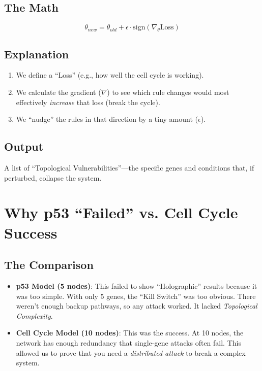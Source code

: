 \documentclass[11pt,a4paper]{article}
\begin{document}
\subsection*{The Math}
\begin{equation}
\theta_{new} = \theta_{old} + \epsilon \cdot \text{sign}(\nabla_{\theta} \text{Loss})
\end{equation}

\subsection*{Explanation}
\begin{enumerate}
    \item We define a ``Loss'' (e.g., how well the cell cycle is working).
    \item We calculate the gradient ($\nabla$) to see which rule changes would most effectively \textit{increase} that loss (break the cycle).
    \item We ``nudge'' the rules in that direction by a tiny amount ($\epsilon$).
\end{enumerate}

\subsection*{Output}
A list of ``Topological Vulnerabilities''—the specific genes and conditions that, if perturbed, collapse the system.

\section{Why p53 ``Failed'' vs. Cell Cycle Success}

\subsection*{The Comparison}
\begin{itemize}
    \item \textbf{p53 Model (5 nodes)}: This failed to show ``Holographic'' results because it was too simple. With only 5 genes, the ``Kill Switch'' was too obvious. There weren't enough backup pathways, so any attack worked. It lacked \textit{Topological Complexity}.
    \item \textbf{Cell Cycle Model (10 nodes)}: This was the success. At 10 nodes, the network has enough redundancy that single-gene attacks often fail. This allowed us to prove that you need a \textit{distributed attack} to break a complex system.
\end{itemize}
\end{document}
